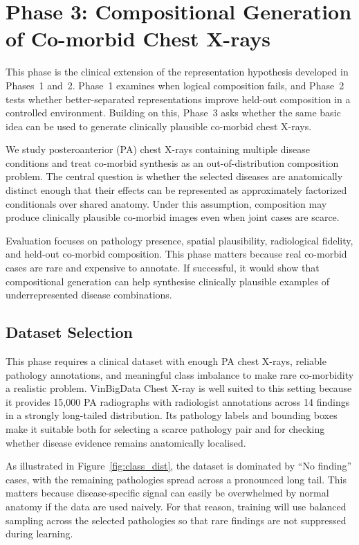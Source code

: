
\section{Phase 3: Compositional Generation of Co-morbid Chest X-rays}
\label{sec:phase_3}
This phase is the clinical extension of the representation hypothesis developed in Phases~1 and~2. 
Phase~1 examines when logical composition fails, and Phase~2 tests whether better-separated representations improve held-out composition in a controlled environment. 
Building on this, Phase~3 asks whether the same basic idea can be used to generate clinically plausible co-morbid chest X-rays.

We study posteroanterior (PA) chest X-rays containing multiple disease conditions and treat co-morbid synthesis as an out-of-distribution composition problem. 
The central question is whether the selected diseases are anatomically distinct enough that their effects can be represented as approximately factorized conditionals over shared anatomy. 
Under this assumption, composition may produce clinically plausible co-morbid images even when joint cases are scarce.

Evaluation focuses on pathology presence, spatial plausibility, radiological fidelity, and held-out co-morbid composition. 
This phase matters because real co-morbid cases are rare and expensive to annotate. 
If successful, it would show that compositional generation can help synthesise clinically plausible examples of underrepresented disease combinations.

\subsection{Dataset Selection}
This phase requires a clinical dataset with enough PA chest X-rays, reliable pathology annotations, and meaningful class imbalance to make rare co-morbidity a realistic problem. VinBigData \citep{vinbigdata-chest-xray-abnormalities-detection} Chest X-ray is well suited to this setting because it provides 15{,}000 PA radiographs with radiologist annotations across 14 findings in a strongly long-tailed distribution. Its pathology labels and bounding boxes make it suitable both for selecting a scarce pathology pair and for checking whether disease evidence remains anatomically localised.

As illustrated in Figure~\ref{fig:class_dist}, the dataset is dominated by ``No finding'' cases, with the remaining pathologies spread across a pronounced long tail. This matters because disease-specific signal can easily be overwhelmed by normal anatomy if the data are used naively. For that reason, training will use balanced sampling across the selected pathologies so that rare findings are not suppressed during learning.

